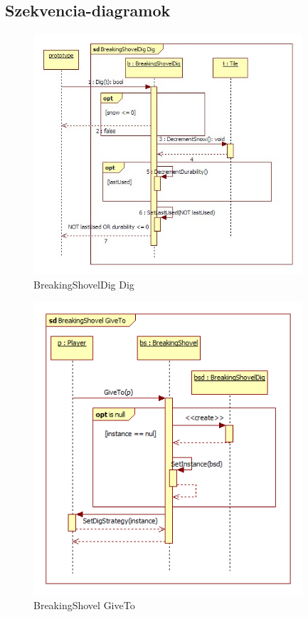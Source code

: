 \subsection{Szekvencia-diagramok}


\begin{figure}[H]
        \begin{center}
                \includegraphics[width=10cm]{chapters/chapter07/seqdiag/BreakingShovelDig_Dig.jpg}
                \caption{BreakingShovelDig Dig}
                \label{BreakingShovelDig Dig}
        \end{center}
\end{figure}
\begin{figure}[H]
        \begin{center}
                \includegraphics[width=10cm]{chapters/chapter07/seqdiag/BreakingShovel_GiveTo.png}
                \caption{BreakingShovel GiveTo}
                \label{BreakingShovel GiveTo}
        \end{center}
\end{figure}
